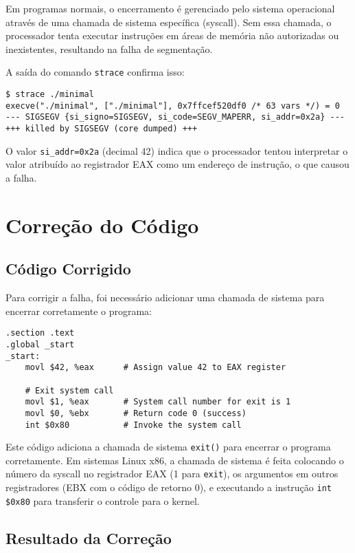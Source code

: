 \documentclass[12pt,a4paper]{article}
\begin{document}
Em programas normais, o encerramento é gerenciado pelo sistema operacional através de uma chamada de sistema específica (syscall). Sem essa chamada, o processador tenta executar instruções em áreas de memória não autorizadas ou inexistentes, resultando na falha de segmentação.

A saída do comando \texttt{strace} confirma isso:

\begin{verbatim}
$ strace ./minimal
execve("./minimal", ["./minimal"], 0x7ffcef520df0 /* 63 vars */) = 0
--- SIGSEGV {si_signo=SIGSEGV, si_code=SEGV_MAPERR, si_addr=0x2a} ---
+++ killed by SIGSEGV (core dumped) +++
\end{verbatim}

O valor \texttt{si\_addr=0x2a} (decimal 42) indica que o processador tentou interpretar o valor atribuído ao registrador EAX como um endereço de instrução, o que causou a falha.

\section{Correção do Código}

\subsection{Código Corrigido}

Para corrigir a falha, foi necessário adicionar uma chamada de sistema para encerrar corretamente o programa:

\begin{verbatim}
.section .text
.global _start
_start:
    movl $42, %eax      # Assign value 42 to EAX register

    # Exit system call
    movl $1, %eax       # System call number for exit is 1
    movl $0, %ebx       # Return code 0 (success)
    int $0x80           # Invoke the system call
\end{verbatim}

Este código adiciona a chamada de sistema \texttt{exit()} para encerrar o programa corretamente. Em sistemas Linux x86, a chamada de sistema é feita colocando o número da syscall no registrador EAX (1 para \texttt{exit}), os argumentos em outros registradores (EBX com o código de retorno 0), e executando a instrução \texttt{int \$0x80} para transferir o controle para o kernel.

\subsection{Resultado da Correção}
\end{document}
